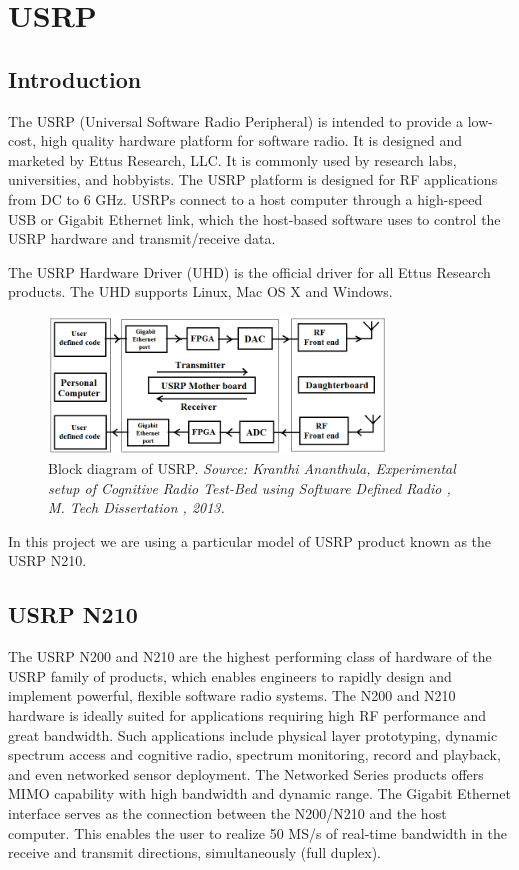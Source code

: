\chapter{USRP}
\section{Introduction}

The USRP (Universal Software Radio Peripheral) is intended to provide a low-cost, high quality hardware platform for software radio. It is designed and marketed by Ettus Research, LLC. It is commonly used by research labs, universities, and hobbyists. The USRP platform is designed for RF applications from DC to 6 GHz. USRPs connect to a host computer through a high-speed USB or Gigabit Ethernet link, which the host-based software uses to control the USRP hardware and transmit/receive data.

The USRP Hardware Driver (UHD) is the official driver for all Ettus Research products. The UHD supports Linux, Mac OS X and Windows.

\begin{figure}[h]
\centering
\includegraphics[width=0.8\textwidth]{usrpBlock}
\caption[Block diagram of USRP]{Block diagram of USRP. \emph{Source:  Kranthi Ananthula, Experimental setup of Cognitive Radio Test-Bed using Software Defined Radio , M. Tech Dissertation , 2013.}}
\label{usrpBlock}
\end{figure}

In this project we are using a particular model of USRP product known as the USRP N210.

\section{USRP N210}

The USRP N200 and N210 are the highest performing class of hardware of the USRP family of products, which enables engineers to rapidly design and implement powerful, flexible software radio systems. The N200 and N210 hardware is ideally suited for applications requiring high RF performance and great bandwidth. Such applications include physical layer prototyping, dynamic spectrum access and cognitive radio, spectrum monitoring, record and playback, and even networked sensor deployment.
The Networked Series products offers MIMO capability with high bandwidth and dynamic range. The Gigabit Ethernet interface serves as the connection between the N200/N210 and the host computer. This enables the user to realize 50 MS/s of real-time bandwidth in the receive and transmit directions, simultaneously (full duplex).

